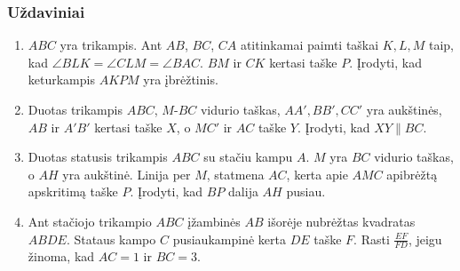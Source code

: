 \subsubsection{Uždaviniai}

\begin{enumerate}
\item $ABC$ yra trikampis. Ant $AB$, $BC$, $CA$ atitinkamai
  paimti taškai $K,L,M$ taip, kad $\angle BLK=\angle
  CLM=\angle BAC$. $BM$ ir $CK$ kertasi taške $P$. Įrodyti,
  kad keturkampis $AKPM$ yra įbrėžtinis.
\item Duotas trikampis $ABC$, $M$-$BC$ vidurio taškas,
  $AA',BB',CC'$ yra aukštinės, $AB$ ir $A'B'$ kertasi taške
  $X$, o $MC'$ ir $AC$ taške $Y$. Įrodyti, kad
  $XY\parallel{BC}$.
\item Duotas statusis trikampis $ABC$ su stačiu kampu $A$.
  $M$ yra $BC$ vidurio taškas, o $AH$ yra aukštinė. Linija
  per $M$, statmena $AC$, kerta apie $AMC$ apibrėžtą
  apskritimą taške $P$. Įrodyti, kad $BP$ dalija $AH$
  pusiau.
\item Ant stačiojo trikampio $ABC$ įžambinės $AB$ išorėje
  nubrėžtas kvadratas $ABDE$. Stataus kampo $C$
  pusiaukampinė kerta $DE$ taške $F$. Rasti $\frac{EF}{FD}$,
  jeigu žinoma, kad $AC=1$ ir $BC=3$. 

\end{enumerate}
